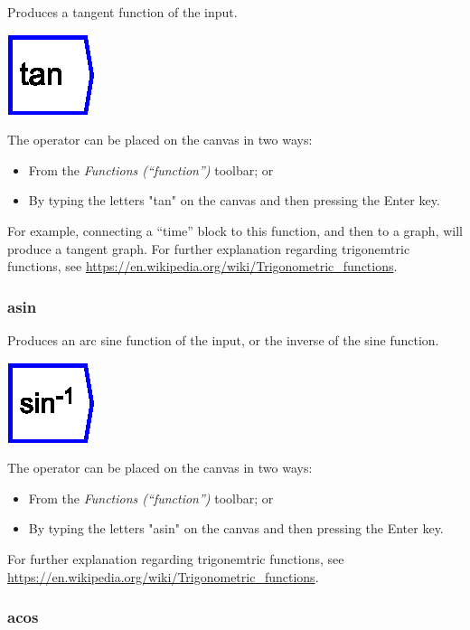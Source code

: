 \label{Operation:tan} Produces a tangent function of the input.

\includegraphics{images/tan}

The operator can be placed on the canvas in two ways:
\begin{itemize}
\item From the \emph{Functions (``function'')} toolbar; or 
\item By typing the letters "tan" on the canvas and then pressing the
Enter key.
\end{itemize}
For example, connecting a ``time'' block to this function, and then
to a graph, will produce a tangent graph. For further explanation
regarding trigonemtric functions, see \url{https://en.wikipedia.org/wiki/Trigonometric_functions}.

\subsubsection{asin}

\label{Operation:asin} Produces an arc sine function of the input,
or the inverse of the sine function.

\includegraphics{images/sin-1}

The operator can be placed on the canvas in two ways:
\begin{itemize}
\item From the \emph{Functions (``function'')} toolbar; or 
\item By typing the letters "asin" on the canvas and then pressing the
Enter key.
\end{itemize}
For further explanation regarding trigonemtric functions, see \url{https://en.wikipedia.org/wiki/Trigonometric_functions}.

\subsubsection{acos}

